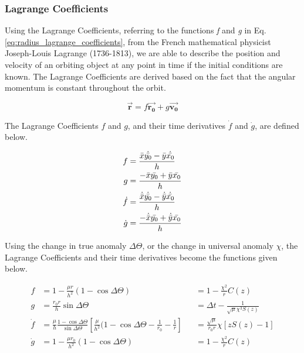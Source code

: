 \subsubsection{Lagrange Coefficients}

Using the Lagrange Coefficients, referring to the functions \textit{f} and \textit{g} in Eq. \ref{eq:radius_lagrange_coefficients}, from the French mathematical physicist Joseph-Louis Lagrange (1736-1813), we are able to describe the position and velocity of an orbiting object at any point in time if the initial conditions are known. The Lagrange Coefficients are derived based on the fact that the angular momentum is constant throughout the orbit.   


\begin{equation}
    \Vec{\mathbf{r}} = f \Vec{\mathbf{r_0}} + g \Vec{\mathbf{v_0}}
    \label{eq:radius_lagrange_coefficients}
\end{equation}

The Lagrange Coefficients $f$ and $g$, and their time derivatives $\dot{f}$ and $\dot{g}$, are defined below.

\begin{align}
    f &= \frac{ \Bar{x} \dot{\Bar{y_0}} - \Bar{y} \dot{\Bar{x_0}} }{ h }
    \label{eq:lagrange_f} \\
    g &= \frac{ - \Bar{x} \Bar{y_0} + \Bar{y} \Bar{x_0} }{ h } 
    \label{eq:lagrange_g} \\
    \dot{f} &= \frac{ \dot{\Bar{x}} \dot{\Bar{y_0}} - \dot{\Bar{y}} \dot{\Bar{x_0}} }{ h } 
    \label{eq:lagrange_f_dot} \\
    \dot{g} &= \frac{ - \dot{\Bar{x}} \Bar{y_0} + \dot{\Bar{y}} \Bar{x_0} }{ h } 
    \label{eq:lagrange_g_dot}
\end{align}

Using the change in true anomaly $\Delta \Theta$, or the change in universal anomaly $\chi$, the Lagrange Coefficients and their time derivatives become the functions given below.

\begin{align}
    f &= 1 - \frac{ \mu r }{ h^2 } ( 1 - \cos{\Delta \Theta} ) &&= 1 - \frac{\chi^2}{r} C(z)
    \label{eq:lagrange_anomaly_f} \\
    g  &= \frac{ r_0 r }{ h } \sin{\Delta \Theta} &&= \Delta t - \frac{1}{\sqrt{\mu} \chi^3 S( z )}
    \label{eq:lagrange_anomaly_g} \\
    \dot{f} &= \frac{\mu}{h} \frac{1 - \cos{\Delta \Theta}}{\sin{\Delta \Theta}} [ \frac{\mu}{h^2} (1 - \cos{\Delta \Theta} - \frac{1}{r_0} - \frac{1}{r} ] &&= \frac{\sqrt{\mu}}{r_0 r} \chi [z S(z) - 1]
    \label{eq:lagrange_anomaly_f_dot} \\
    \dot{g} &= 1 - \frac{\mu r_0}{h^2} (1 - \cos{\Delta \Theta} ) &&= 1 - \frac{\chi^2}{r} C(z)
    \label{eq:lagrange_anomaly_g_dot}
\end{align}

